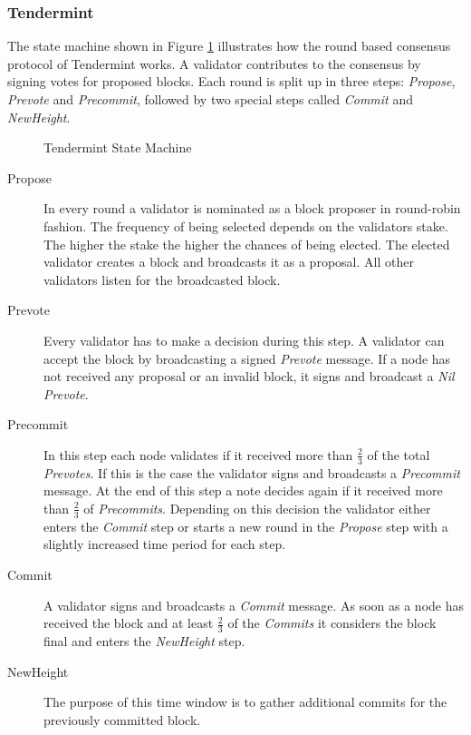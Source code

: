 \subsubsection{Tendermint}
The state machine shown in Figure \ref{tendermint_state_machine} illustrates how the round based consensus protocol of Tendermint \cite{tendermit_paper} works. A validator contributes to the consensus by signing votes for proposed blocks. Each round is split up in three steps: \textit{Propose}, \textit{Prevote} and \textit{Precommit}, followed by two special steps called \textit{Commit} and \textit{NewHeight}.

\begin{figure}[H]
	\begin{center}
		
	\end{center}
	\caption{Tendermint State Machine \cite{tendermit_docs}}
	\label{tendermint_state_machine}
\end{figure}

\begin{description}
	\item[Propose] In every round a validator is nominated as a block proposer in round-robin fashion. The frequency of being selected depends on the validators stake. The higher the stake the higher the chances of being elected. The elected validator creates a block and broadcasts it as a proposal. All other validators listen for the broadcasted block.
	
	\item[Prevote] Every validator has to make a decision during this step. A validator can accept the block by broadcasting a signed \textit{Prevote} message. If a node has not received any proposal or an invalid block, it signs and broadcast a \textit{Nil Prevote}.
	
	\item[Precommit] In this step each node validates if it received more than \( \frac{2}{3} \) of the total \textit{Prevotes}. If this is the case the validator signs and broadcasts a \textit{Precommit} message. At the end of this step a note decides again if it received more than  \( \frac{2}{3} \) of \textit{Precommits}. Depending on this decision the validator either enters the \textit{Commit} step or starts a new round in the \textit{Propose} step with a slightly increased time period for each step. 
	
	\item[Commit]  A validator signs and broadcasts a \textit{Commit} message. As soon as a node has received the block and at least  \( \frac{2}{3} \) of the \textit{Commits} it considers the block \textit{} final and enters the \textit{NewHeight} step.
	
	\item[NewHeight] The purpose of this time window is to gather additional commits for the previously committed block. 
\end{description}


